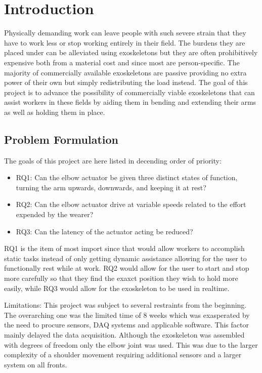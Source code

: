 \section{Introduction}
\label{section:intro}

Physically demanding work can leave people with such severe strain that they have to work less or stop working entirely in 
their field\cite{WorkDemands}. The burdens they are placed under can be alleviated using exoskeletons but they are often 
prohibitively expensive both from a material cost and since most are person-specific. The majority of commercially available 
exoskeletons are passive providing no extra power of their own but simply redistributing the load instead. The goal of this 
project is to advance the possibility of commercially viable exoskeletons that can assist workers in these fields by aiding 
them in bending and extending their arms as well as holding them in place.

\subsection{Problem Formulation}
The goals of this project are here listed in decending order of priority:
\begin{itemize}
        
    \item RQ1: Can the elbow actuator be given three distinct states of function, turning the arm upwards, downwards, and keeping it at rest?

    \item RQ2: Can the elbow actuator drive at variable speeds related to the effort expended by the wearer?

    \item RQ3: Can the latency of the actuator acting be reduced?

\end{itemize}
RQ1 is the item of most import since that would allow workers to accomplish static tasks instead of only getting dynamic assistance 
allowing for the user to functionally rest while at work. RQ2 would allow for the user to start and stop more carefully so that they 
find the exaxct position they wish to hold more easily, while RQ3 would allow for the exoskeleton to be used in realtime.


Limitations:
    This project was subject to several restraints from the beginning. The overarching one was the limited time of 8 weeks which was
    exasperated by the need to procure sensors, DAQ systems and applicable software. This factor mainly delayed the data acquisition. 
    Although the exoskeleton was assembled with degrees of freedom only the elbow joint was used. This was due to the larger complexity 
    of a shoulder movement requiring additional sensors and a larger system on all fronts.


